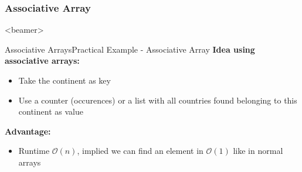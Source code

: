 \subsubsection{Associative Array}

\begin{frame}<beamer>{\LectureToC}
\end{frame}

\begin{frame}{Associative Arrays}{Practical Example - Associative Array}
  \textbf{Idea using associative arrays:}
  \begin{itemize}
    \item
      Take the continent as {\color{Mittel-Blau}key}
    \item
      Use a counter (occurences) or a list with all countries found belonging
      to this continent as {\color{Mittel-Blau}value}
  \end{itemize}
  \textbf{Advantage:}
  \begin{itemize}
    \item
      Runtime $\mathcal{O}(n)$, implied we can find an element in 
      $\mathcal{O}(1)$ like in normal arrays
  \end{itemize}
\end{frame}






